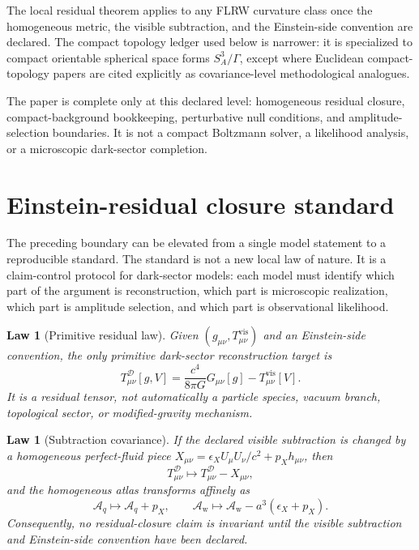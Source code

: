 \documentclass[
  aps,
  prd,
  reprint,
  superscriptaddress,
  floatfix,
  nofootinbib,
  longbibliography
]{revtex4-2}
\theoremstyle{plain}
\newtheorem{law}[theorem]{Law}
\theoremstyle{definition}
\theoremstyle{remark}
\newcommand{\D}{\mathcal D}
\newcommand{\vis}{\mathrm{vis}}
\newcommand{\Aq}{\mathcal A_q}
\newcommand{\Aw}{\mathcal A_{\mathrm w}}
\newcommand{\eps}{\epsilon}
\begin{document}
The local residual theorem applies to any FLRW curvature class once the
homogeneous metric, the visible subtraction, and the Einstein-side convention
are declared.  The compact topology ledger used below is narrower: it is
specialized to compact orientable spherical space forms \(S_A^3/\Gamma\), except
where Euclidean compact-topology papers are cited explicitly as covariance-level
methodological analogues.

The paper is complete only at this declared level: homogeneous residual
closure, compact-background bookkeeping, perturbative null conditions, and
amplitude-selection boundaries.  It is not a compact Boltzmann solver, a
likelihood analysis, or a microscopic dark-sector completion.


\section{Einstein-residual closure standard}

The preceding boundary can be elevated from a single model statement to a
reproducible standard.  The standard is not a new local law of nature.  It is a
claim-control protocol for dark-sector models: each model must identify which
part of the argument is reconstruction, which part is microscopic realization,
which part is amplitude selection, and which part is observational likelihood.

\begin{law}[Primitive residual law]
Given \((g_{\mu\nu},T^{\vis}_{\mu\nu})\) and an Einstein-side convention, the
only primitive dark-sector reconstruction target is
\begin{equation}
T^\D_{\mu\nu}[g,V]
=
\frac{c^4}{8\pi G}G_{\mu\nu}[g]-T^{\vis}_{\mu\nu}[V].
\label{eq:standard_primitive_residual}
\end{equation}
It is a residual tensor, not automatically a particle species, vacuum branch,
topological sector, or modified-gravity mechanism.
\end{law}

\begin{law}[Subtraction covariance]
If the declared visible subtraction is changed by a homogeneous perfect-fluid
piece \(X_{\mu\nu}=\eps_X U_\mu U_\nu/c^2+p_Xh_{\mu\nu}\), then
\begin{equation}
T^\D_{\mu\nu}\mapsto T^\D_{\mu\nu}-X_{\mu\nu},
\label{eq:standard_subtraction_covariance_tensor}
\end{equation}
and the homogeneous atlas transforms affinely as
\begin{equation}
\Aq\mapsto \Aq+p_X,
\qquad
\Aw\mapsto \Aw-a^3(\eps_X+p_X).
\label{eq:standard_subtraction_covariance_atlas}
\end{equation}
Consequently, no residual-closure claim is invariant until the visible
subtraction and Einstein-side convention have been declared.
\end{law}
\end{document}
